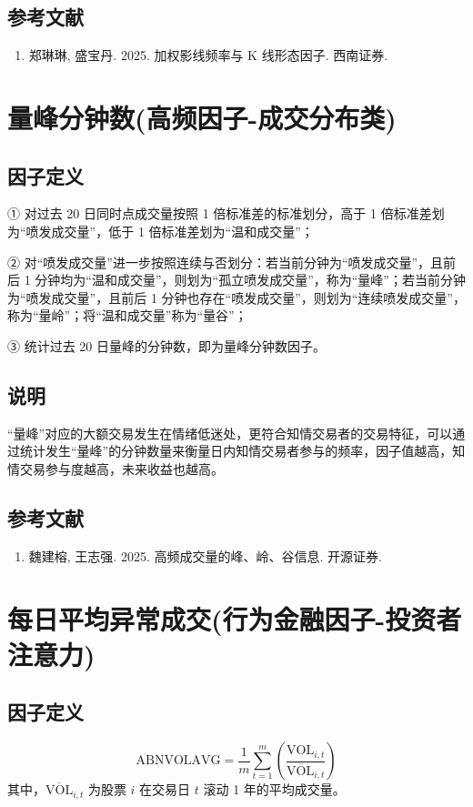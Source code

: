 \documentclass{article}
\begin{document}
\subsection{参考文献}
\begin{enumerate}
    \item 郑琳琳, 盛宝丹. 2025. 加权影线频率与 K 线形态因子. 西南证券.
\end{enumerate}

\section{量峰分钟数(高频因子-成交分布类)}

\subsection{因子定义}

① 对过去 20 日同时点成交量按照 1 倍标准差的标准划分，高于 1 倍标准差划为“喷发成交量”，低于 1 倍标准差划为“温和成交量”；

② 对“喷发成交量”进一步按照连续与否划分：若当前分钟为“喷发成交量”，且前后 1 分钟均为“温和成交量”，则划为“孤立喷发成交量”，称为“量峰”；若当前分钟为“喷发成交量”，且前后 1 分钟也存在“喷发成交量”，则划为“连续喷发成交量”，称为“量岭”；将“温和成交量”称为“量谷”；

③ 统计过去 20 日量峰的分钟数，即为量峰分钟数因子。

\subsection{说明}
“量峰”对应的大额交易发生在情绪低迷处，更符合知情交易者的交易特征，可以通过统计发生“量峰”的分钟数量来衡量日内知情交易者参与的频率，因子值越高，知情交易参与度越高，未来收益也越高。

\subsection{参考文献}
\begin{enumerate}
    \item 魏建榕, 王志强. 2025. 高频成交量的峰、岭、谷信息. 开源证券.
\end{enumerate}

\section{每日平均异常成交(行为金融因子-投资者注意力)}

\subsection{因子定义}
\begin{equation}
    \mathrm{ABNVOLAVG} = \frac{1}{m} \sum_{t=1}^{m} \left( \frac{\mathrm{VOL}_{i,t}}{\overline{\mathrm{VOL}}_{i,t}} \right)
\end{equation}
其中，\(\overline{\mathrm{VOL}}_{i,t}\) 为股票 \( i \) 在交易日 \( t \) 滚动 1 年的平均成交量。
\end{document}

